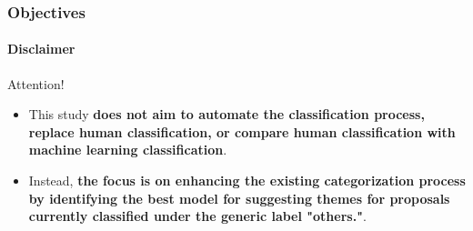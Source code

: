 \begin{frame}
	\frametitle{Objectives}
	\framesubtitle{Disclaimer}
		
	\begin{alertblock}{Attention!} 
		\begin{itemize}
			\item This study \textbf{does not aim to automate the classification process, replace human classification, or compare human classification with machine learning classification}. 
			
			\item Instead, \textbf{the focus is on enhancing the existing categorization process by identifying the best model for suggesting themes for proposals currently classified under the generic label "others."}.
		\end{itemize}
	\end{alertblock}
	

	
	
	
\end{frame}





